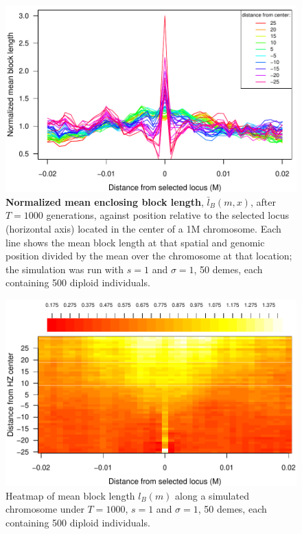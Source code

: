 \begin{figure}
\includegraphics{figs/blocksAlongChromAncBConditioning.pdf}
\caption{
    \textbf{Normalized mean enclosing block length}, $\bar l_B(m,x)$, after $T=1000$ generations,
    against position relative to the selected locus (horizontal axis)
    located in the center of a 1M chromosome.
    Each line shows the mean block length at that spatial and genomic position
    divided by the mean over the chromosome at that location;
    the simulation was run with $s=1$ and $\sigma=1$,
    50 demes, each containing 500 diploid individuals.
}\label{Fig:blockLengths}
\end{figure}


\begin{figure}
\includegraphics{figs/blocksAlongChromHeatmapAncBConditioning.pdf}
\caption{Heatmap of mean block length $l_B(m)$ along a simulated chromosome under $T=1000$, $s=1$ and $\sigma=1$,
    50 demes, each containing 500 diploid individuals. }\label{Supp:blockLengthHeatmap}
\end{figure}




